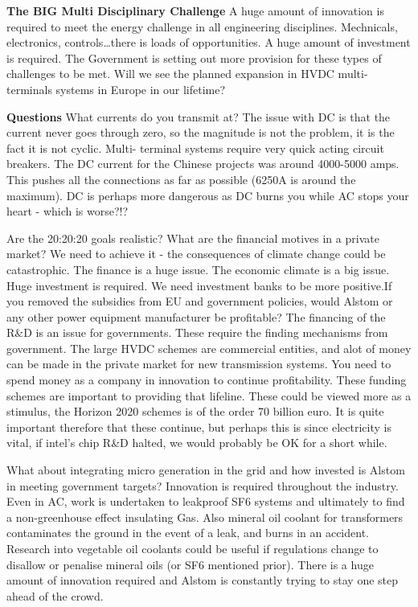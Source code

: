 \textbf{The BIG Multi Disciplinary Challenge}
A huge amount of innovation is required to meet the energy challenge in all engineering disciplines. 
Mechnicals, electronics, controls\dots there is loads of opportunities. 
A huge amount of investment is required.
 The Government is setting out more provision for these types of challenges to be met.
Will we see the planned expansion in HVDC multi-terminals systems in Europe in our lifetime?

\textbf{Questions}
What currents do you transmit at? The issue with DC is that the current never goes through zero, so the magnitude is not the problem, it is the fact it is not cyclic. Multi-
terminal systems require very quick acting circuit breakers. The DC current for the Chinese projects was around 4000-5000 amps. This pushes all the connections as far as possible (6250A is around the maximum). DC is perhaps more dangerous as DC burns 
you while AC stops your heart - which is worse?!?

Are the 20:20:20 goals realistic? What are the financial motives in a private market? We need to achieve it - the consequences of climate change could be catastrophic. The finance is a huge issue. The economic climate is a big issue. Huge investment is required. We need investment banks to be more positive.If you removed the subsidies from EU and government policies, would Alstom or any other power equipment manufacturer be profitable? The financing of the R\&D is an issue for governments. These require the finding mechanisms from government. The large HVDC schemes are commercial entities, and alot of money can be made in the private market for new transmission systems. You need to spend money as a company in innovation to continue profitability. These funding schemes are important to providing that lifeline. These could be viewed more as a stimulus, the Horizon 2020 schemes is of the order 70 billion euro. It is quite important therefore that these continue, but perhaps this is since electricity is vital, if intel's chip R\&D halted, we would probably be OK for a short while.

What about integrating micro generation in the grid and how invested is Alstom in meeting government targets? Innovation is required throughout the industry. Even in AC, work is undertaken to leakproof SF6 systems and ultimately to find a non-greenhouse effect insulating Gas. Also mineral oil coolant for transformers contaminates the ground in the event of a leak, and burns in an accident. Research into vegetable oil coolants could be useful if regulations change to disallow or penalise mineral oils (or SF6 mentioned prior). There is a huge amount of innovation required and Alstom is constantly trying to stay one step ahead of the crowd.


